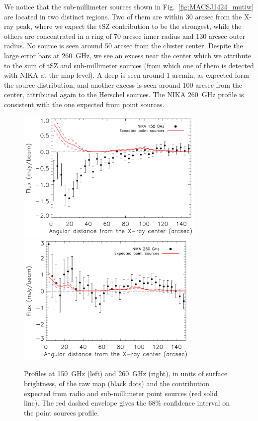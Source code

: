 \documentclass[twocolumn,traditabstract]{aa}
\begin{document}
We notice that the sub-millimeter sources shown in Fig.~\ref{fig:MACSJ1424_mutiw} are located in two distinct regions. Two of them are within 30 arcsec from the X-ray peak, where we expect the tSZ contribution to be the strongest, while the others are concentrated in a ring of 70 arcsec inner radius and 130 arcsec outer radius. No source is seen around 50 arcsec from the cluster center. Despite the large error bars at 260~GHz, we see an excess near the center which we attribute to the sum of tSZ and sub-millimeter sources (from which one of them is detected with NIKA at the map level). A deep is seen around 1 arcmin, as expected form the source distribution, and another excess is seen around 100 arcsec from the center, attributed again to the Herschel sources. The NIKA 260~GHz profile is consistent with the one expected from point sources.
\begin{figure}[h]
\centering
\includegraphics[height=6.4cm]{Figure/MACSJ1424_profile2mm_plus_ps.pdf}
\includegraphics[height=6.4cm]{Figure/MACSJ1424_profile1mm_plus_ps.pdf}
\caption{Profiles at 150~GHz (left) and 260~GHz (right), in units of surface brightness, of the raw map (black dots) and the contribution expected from radio and sub-millimeter point sources (red solid line). The red dashed envelope gives the 68\% confidence interval on the point sources profile.}
\label{fig:flux_profiles}
\end{figure}
\end{document}
